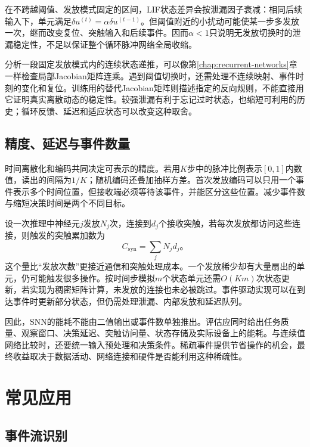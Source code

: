 在不跨越阈值、发放模式固定的区间，LIF状态差异会按泄漏因子衰减：相同后续输入下，单元满足$\delta u^{(t)}=\alpha\delta u^{(t-1)}$。但阈值附近的小扰动可能使某一步多发放一次，继而改变复位、突触输入和后续事件。因而$\alpha<1$只说明无发放切换时的泄漏稳定性，不足以保证整个循环脉冲网络全局收缩。

分析一段固定发放模式内的连续状态递推，可以像第\ref{chap:recurrent-networks}章一样检查局部Jacobian矩阵连乘。遇到阈值切换时，还需处理不连续映射、事件时刻的变化和复位。训练用的替代Jacobian矩阵则描述指定的反向规则，不能直接用它证明真实离散动态的稳定性。较强泄漏有利于忘记过时状态，也缩短可利用的历史；循环反馈、延迟和适应状态可以改变这种取舍。

\subsection{精度、延迟与事件数量}
\label{sec:snn-cost}

时间离散化和编码共同决定可表示的精度。若用$K$步中的脉冲比例表示$[0,1]$内数值，读出的间隔为$1/K$；随机编码还叠加抽样方差。首次发放编码可以只用一个事件表示多个时间位置，但接收端必须等待该事件，并能区分这些位置。减少事件数与缩短决策时间是两个不同目标。

设一次推理中神经元$j$发放$N_j$次，连接到$d_j$个接收突触，若每次发放都访问这些连接，则触发的突触累加数为
\begin{equation}
  C_{\mathrm{syn}}=\sum_jN_jd_j\text{。}
  \label{eq:snn-event-cost}
\end{equation}
这个量比“发放次数”更接近通信和突触处理成本。一个发放稀少却有大量扇出的单元，仍可能触发很多操作。按时间步模拟$m$个状态单元还需$O(Km)$次状态更新，若实现为稠密矩阵计算，未发放的连接也未必被跳过。事件驱动实现可以在到达事件时更新部分状态，但仍需处理泄漏、内部发放和延迟队列。

因此，SNN的能耗不能由二值输出或事件数单独推出。评估应同时给出任务质量、观察窗口、决策延迟、突触访问量、状态存储及实际设备上的能耗。与连续值网络比较时，还要统一输入预处理和决策条件。稀疏事件提供节省操作的机会，最终收益取决于数据活动、网络连接和硬件是否能利用这种稀疏性。

\section{常见应用}
\label{sec:snn-applications}

\subsection{事件流识别}
\label{sec:snn-event-recognition}

